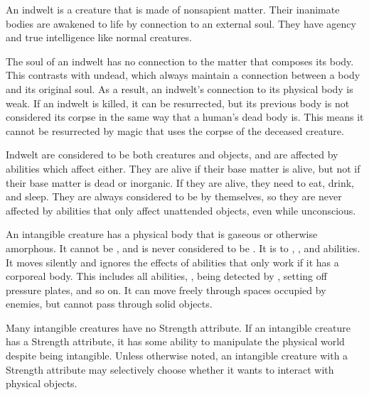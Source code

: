     An indwelt is a creature that is made of nonsapient matter.
    Their inanimate bodies are awakened to life by connection to an external soul.
    They have agency and true intelligence like normal creatures.

    The soul of an indwelt has no connection to the matter that composes its body.
    This contrasts with undead, which always maintain a connection between a body and its original soul.
    As a result, an indwelt's connection to its physical body is weak.
    If an indwelt is killed, it can be resurrected, but its previous body is not considered its corpse in the same way that a human's dead body is.
    This means it cannot be resurrected by magic that uses the corpse of the deceased creature.

    Indwelt are considered to be both creatures and objects, and are affected by abilities which affect either.
    They are alive if their base matter is alive, but not if their base matter is dead or inorganic.
    If they are alive, they need to eat, drink, and sleep.
    They are always considered to be  by themselves, so they are never affected by abilities that only affect unattended objects, even while unconscious.

  An intangible creature has a physical body that is gaseous or otherwise amorphous.
  It cannot be , and is never considered to be \squeezing.
  It is  to , \atCreation, and \atManifestation abilities.
  It moves silently and ignores the effects of abilities that only work if it has a corporeal body.
  This includes all  abilities, , being detected by , setting off pressure plates, and so on.
  It can move freely through spaces occupied by enemies, but cannot pass through solid objects.

  Many intangible creatures have no Strength attribute.
  If an intangible creature has a Strength attribute, it has some ability to manipulate the physical world despite being intangible.
  Unless otherwise noted, an intangible creature with a Strength attribute may selectively choose whether it wants to interact with physical objects.

